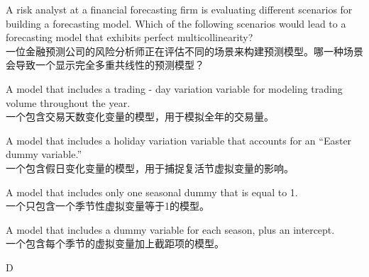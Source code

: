 \documentclass{article}
\newcounter{question} %
\begin{document}
\begin{question}
    A risk analyst at a financial forecasting firm is evaluating different scenarios for building a forecasting model. Which of the following scenarios would lead to a forecasting model that exhibits perfect multicollinearity?\\
    一位金融预测公司的风险分析师正在评估不同的场景来构建预测模型。哪一种场景会导致一个显示完全多重共线性的预测模型？
    \end{question}
    
    \begin{choices}
        \item A model that includes a trading - day variation variable for modeling trading volume throughout the year.\\
        一个包含交易天数变化变量的模型，用于模拟全年的交易量。
        \item A model that includes a holiday variation variable that accounts for an “Easter dummy variable.”\\
        一个包含假日变化变量的模型，用于捕捉复活节虚拟变量的影响。
        \item A model that includes only one seasonal dummy that is equal to 1.\\
        一个只包含一个季节性虚拟变量等于1的模型。
        \item A model that includes a dummy variable for each season, plus an intercept.\\
        一个包含每个季节的虚拟变量加上截距项的模型。
    \end{choices}
    
    \begin{correctanswer}
        D
    \end{correctanswer}
    
\end{document}
